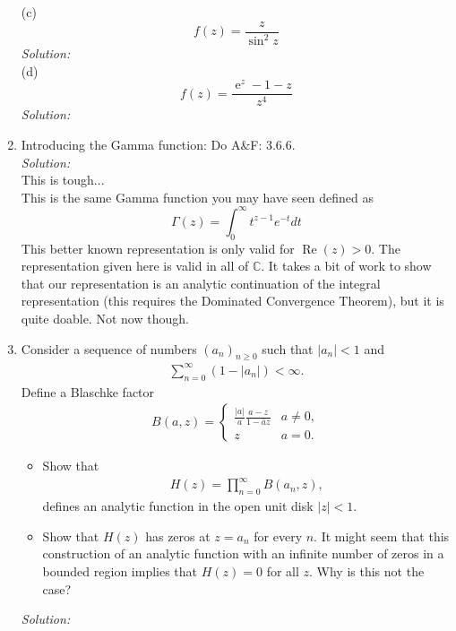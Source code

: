 \documentclass[10pt]{amsart}
\DeclareMathOperator{\E}{e}
\theoremstyle{nonumberplain}
\begin{document}
\begin{enumerate}[label={\bf {\arabic*}:}]
\noindent
(c)
$$
f(z) = \frac z {\sin^2 z}
$$
\textit{Solution:} \\

\noindent
(d)
$$
f(z) = \frac {\E^z - 1 - z}{z^4}
$$
\textit{Solution:} \\
\newpage

\item Introducing the Gamma function: Do A\&F: 3.6.6. \\

\noindent
\textit{Solution:} \\
This is tough... \\

\noindent
This is the same Gamma function you may have seen defined as
$$
\Gamma(z)=\int_0^{\infty} t^{z-1} e^{-t} d t
$$
This better known representation is only valid for
$\operatorname{Re}(z)>0$. The representation given here is valid in
all of $\mathbb{C}$. It takes a bit of work to show that our
representation is an analytic continuation of the integral
representation (this requires the Dominated Convergence Theorem), but
it is quite doable. Not now though. \\
\newpage

\item Consider a sequence of numbers $(a_n)_{n \geq 0}$ such that
  $|a_n| < 1$ and
  \begin{align*}
    \sum_{n = 0}^\infty (1 - |a_n|) < \infty.
  \end{align*}
  Define a Blaschke  factor
  \begin{align*}
    B(a,z) = \begin{cases} \frac{|a|}{a} \frac{ a - z}{ 1 - \bar a z}
      & a \neq 0,\\
      z & a  =0.\end{cases}
  \end{align*}
  \begin{itemize}
  \item Show that
  \begin{align*}
    H(z) = \prod_{n=0}^\infty B(a_n,z),
  \end{align*}
  defines an analytic function in the open unit disk $|z| < 1$.
  \item Show that $H(z)$ has zeros at $z = a_n$ for every $n$.  It
    might seem that this construction of an analytic function with an
    infinite number of zeros in a bounded region implies that $H(z) =
    0$ for all $z$.  Why is this not the case? \\
  \end{itemize}
\textit{Solution:} \\
\newpage


\end{enumerate}
\end{document}
